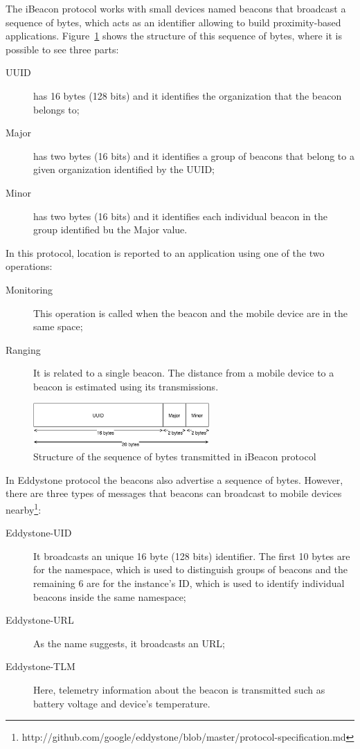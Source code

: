 The iBeacon protocol works with small devices named beacons that broadcast a sequence of bytes, which acts as an identifier allowing to build proximity-based applications\cite{ibeacon_book}.
Figure~\ref{fig:ibeacon_message} shows the structure of this sequence of bytes, where it is possible to see three parts:
\begin{description}
  \item[\gls{UUID}] has 16 bytes (128 bits) and it identifies the organization that the beacon belongs to;
  \item[Major] has two bytes (16 bits) and it identifies a group of beacons that belong to a given organization identified by the \gls{UUID};
  \item[Minor] has two bytes (16 bits) and it identifies each individual beacon in the group identified bu the Major value.
\end{description}
In this protocol, location is reported to an application using one of the two operations:
\begin{description}
  \item[Monitoring] This operation is called when the beacon and the mobile device are in the same space;
  \item[Ranging] It is related to a single beacon. The distance from a mobile device to a beacon is estimated using its transmissions.
\end{description}

\begin{figure}[!ht]
  \centering
    \includegraphics[width=0.6\textwidth, keepaspectratio]{images/ibeacon_message}
    \caption[iBeacon message structure]{Structure of the sequence of bytes transmitted in iBeacon protocol}
    \label{fig:ibeacon_message}
\end{figure}

In Eddystone protocol the beacons also advertise a sequence of bytes.
However, there are three types of messages that beacons can broadcast to mobile devices nearby\footnote{http://github.com/google/eddystone/blob/master/protocol-specification.md}:
\begin{description}
  \item[Eddystone-UID]
  It broadcasts an unique 16 byte (128 bits) identifier. The first 10 bytes are for the namespace, which is used to distinguish groups of beacons and the remaining 6 are for the instance's \gls{ID}, which is used to identify individual beacons inside the same namespace;
  \item[Eddystone-URL]
  As the name suggests, it broadcasts an \gls{URL};
  \item[Eddystone-TLM]
  Here, telemetry information about the beacon is transmitted such as battery voltage and device's temperature.
\end{description}


